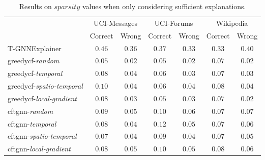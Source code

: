 \begin{table}[ht]
    \centering
    \small
    \begin{tabular}{lcccccc}
    \hline
         &  \multicolumn{2}{c}{UCI-Messages}&  \multicolumn{2}{c}{UCI-Forums}&  \multicolumn{2}{c}{Wikipedia}\\
         &  Correct&  Wrong&  Correct&  Wrong&  Correct& Wrong\\
         \hline
         T-GNNExplainer&  $0.46$&  $0.36$&  $0.37$&  $0.33$&  $0.33$& $0.40$\\
         \gls{greedycf}-\textit{random}&  $0.05$&  $0.02$&  $0.05$&  $0.02$&  $0.07$& $0.02$\\
         \gls{greedycf}-\textit{temporal}&  $0.08$&  $0.04$&  $0.06$&  $0.03$&  $0.07$& $0.03$\\
         \gls{greedycf}-\textit{spatio-temporal}&  $0.10$&  $0.04$&  $0.06$&  $0.04$&  $0.08$& $0.04$\\
         \gls{greedycf}-\textit{local-gradient}&  $0.08$&  $0.03$&  $0.05$&  $0.03$&  $0.07$& $0.02$\\
         \gls{cftgnn}-\textit{random}&  $0.09$&  $0.05$&  $0.10$&  $0.06$&  $0.07$& $0.07$\\
         \gls{cftgnn}-\textit{temporal}&  $0.08$&  $0.04$&  $0.12$&  $0.05$&  $0.07$& $0.06$\\
         \gls{cftgnn}-\textit{spatio-temporal}&  $0.07$&  $0.04$&  $0.09$&  $0.04$&  $0.07$& $0.05$\\
 \gls{cftgnn}-\textit{local-gradient}& $0.08$& $0.05$& $0.10$& $0.05$& $0.08$&$0.06$\\
 \hline
    \end{tabular}
    \caption{Results on $sparsity$ values when only considering sufficient explanations.}
    \label{t_spar_suf}
\end{table}

